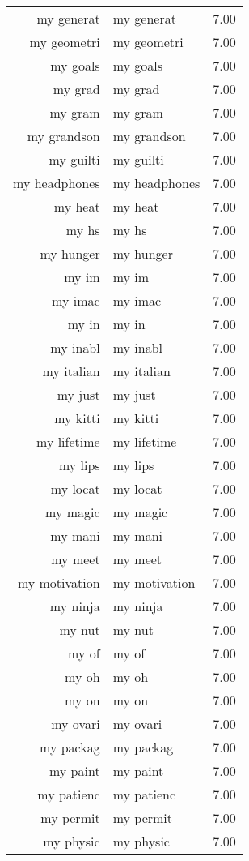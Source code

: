 \begin{table}[ht]
\begin{tabular}{rlr}
  my generat & my generat & 7.00 \\ 
  my geometri & my geometri & 7.00 \\ 
  my goals & my goals & 7.00 \\ 
  my grad & my grad & 7.00 \\ 
  my gram & my gram & 7.00 \\ 
  my grandson & my grandson & 7.00 \\ 
  my guilti & my guilti & 7.00 \\ 
  my headphones & my headphones & 7.00 \\ 
  my heat & my heat & 7.00 \\ 
  my hs & my hs & 7.00 \\ 
  my hunger & my hunger & 7.00 \\ 
  my im & my im & 7.00 \\ 
  my imac & my imac & 7.00 \\ 
  my in & my in & 7.00 \\ 
  my inabl & my inabl & 7.00 \\ 
  my italian & my italian & 7.00 \\ 
  my just & my just & 7.00 \\ 
  my kitti & my kitti & 7.00 \\ 
  my lifetime & my lifetime & 7.00 \\ 
  my lips & my lips & 7.00 \\ 
  my locat & my locat & 7.00 \\ 
  my magic & my magic & 7.00 \\ 
  my mani & my mani & 7.00 \\ 
  my meet & my meet & 7.00 \\ 
  my motivation & my motivation & 7.00 \\ 
  my ninja & my ninja & 7.00 \\ 
  my nut & my nut & 7.00 \\ 
  my of & my of & 7.00 \\ 
  my oh & my oh & 7.00 \\ 
  my on & my on & 7.00 \\ 
  my ovari & my ovari & 7.00 \\ 
  my packag & my packag & 7.00 \\ 
  my paint & my paint & 7.00 \\ 
  my patienc & my patienc & 7.00 \\ 
  my permit & my permit & 7.00 \\ 
  my physic & my physic & 7.00 \\ 

\end{tabular}
\end{table}
